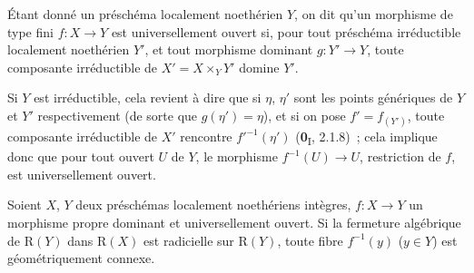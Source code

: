 \begin{definition}[4.3.9]
\label{III.4.3.9-fr}
Étant donné un préschéma localement noethérien $Y$, on dit qu'un morphisme \textup{de
type fini} $f:X\to Y$ est universellement ouvert si, pour tout
préschéma irréductible localement noethérien $Y'$, et tout morphisme dominant
$g:Y'\to Y$, toute composante irréductible de $X'=X\times_YY'$ domine $Y'$.
\end{definition}

Si $Y$ est irréductible, cela revient à dire que si $\eta$, $\eta'$ sont les
points génériques de $Y$ et $Y'$ respectivement (de sorte que
$g(\eta')=\eta$), et si on pose $f'=f_{(Y')}$, toute composante irréductible
de $X'$ rencontre $f'^{-1}(\eta')$ (\textbf{0}\textsubscript{I}, 2.1.8)~; cela
implique donc que pour tout ouvert $U$ de $Y$, le morphisme
$f^{-1}(U)\to U$, restriction de $f$, est universellement ouvert.

\begin{corollary}[4.3.10]
\label{III.4.3.10-fr}
Soient $X$, $Y$ deux préschémas localement noethériens intègres,
$f:X\to Y$ un morphisme propre dominant et universellement ouvert. Si la
fermeture algébrique de $\mathrm R(Y)$ dans $\mathrm R(X)$ est radicielle
sur $\mathrm R(Y)$, toute fibre $f^{-1}(y)$ ($y\in Y$) est géométriquement
connexe.
\end{corollary}

